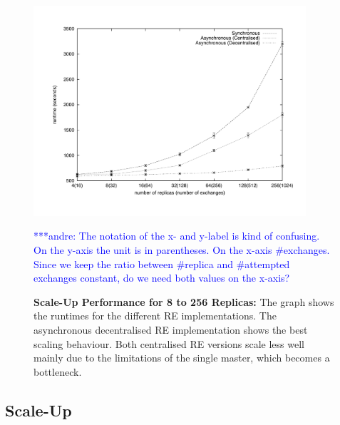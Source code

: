 \documentclass{rspublic}
\newcommand{\alnote}[1]{ {\textcolor{blue} { ***andre: #1 }}}
\newcommand{\alnote}[1]{}
\begin{document}

%
\begin{figure}
\centering
\includegraphics[width=0.9\textwidth]{../data/scale_up_gnu.pdf}
\caption{\small \textbf{Scale-Up Performance for 8 to 256 Replicas:} 
  The graph shows the runtimes for the different RE implementations.
  The asynchronous decentralised RE implementation shows the best
  scaling behaviour. Both centralised RE versions scale less well mainly due
  to the limitations of the single master, which becomes a bottleneck.}
\label{fig:graph}
\alnote{The notation of the x- and y-label is kind of confusing. On the y-axis
the unit is in parentheses. On the x-axis \#exchanges. Since we keep the ratio between
\#replica and \#attempted exchanges constant, do we need both values on the x-axis?}
\vspace{-1em}
\end{figure}

\subsection{Scale-Up}
\end{document}
